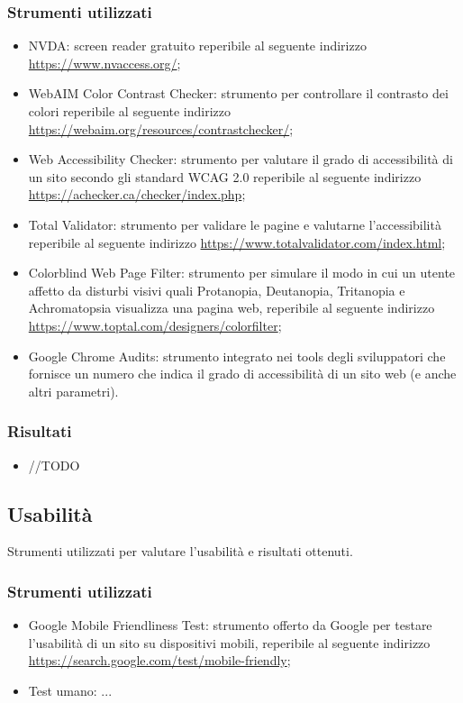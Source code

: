 \documentclass[12pt]{article}
\begin{document}
	\subsubsection{Strumenti utilizzati}
		\begin{itemize}
			\item NVDA: screen reader gratuito reperibile al seguente indirizzo \url{https://www.nvaccess.org/};
			\item WebAIM Color Contrast Checker: strumento per controllare il contrasto dei colori reperibile al seguente indirizzo \url{https://webaim.org/resources/contrastchecker/};
			\item Web Accessibility Checker: strumento per valutare il grado di accessibilità di un sito secondo gli standard WCAG 2.0 reperibile al seguente indirizzo \url{https://achecker.ca/checker/index.php};
			\item Total Validator: strumento per validare le pagine e valutarne l'accessibilità reperibile al seguente indirizzo \url{https://www.totalvalidator.com/index.html};
			\item Colorblind Web Page Filter: strumento per simulare il modo in cui un utente affetto da disturbi visivi quali Protanopia, Deutanopia, Tritanopia e Achromatopsia visualizza una pagina web, reperibile al seguente indirizzo \url{https://www.toptal.com/designers/colorfilter};
			\item Google Chrome Audits: strumento integrato nei tools degli sviluppatori che fornisce un numero che indica il grado di accessibilità di un sito web (e anche altri parametri).
		\end{itemize}
	\subsubsection{Risultati}
		\begin{itemize}
			\item //TODO
		\end{itemize}
	
	\subsection{Usabilità}
	Strumenti utilizzati per valutare l'usabilità e risultati ottenuti.
	\subsubsection{Strumenti utilizzati}
		\begin{itemize}
			\item Google Mobile Friendliness Test: strumento offerto da Google per testare l'usabilità di un sito su dispositivi mobili, reperibile al seguente indirizzo \url{https://search.google.com/test/mobile-friendly};
			\item Test umano: ...
		\end{itemize}
\end{document}
